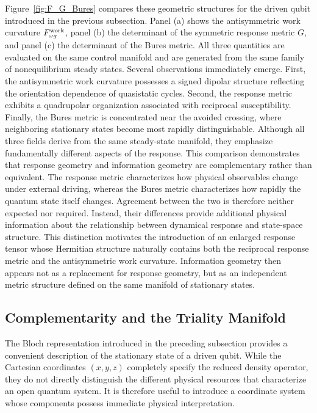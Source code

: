 Figure~\ref{fig:F_G_Bures} compares these geometric structures
for the driven qubit introduced in the previous subsection.
Panel (a) shows the antisymmetric work curvature
$F_{\omega g}^{\rm work}$, panel (b) the determinant of the
symmetric response metric $G$, and panel (c) the determinant of
the Bures metric. All three quantities are evaluated on the same
control manifold and are generated from the same family of
nonequilibrium steady states.
Several observations immediately emerge. First, the
antisymmetric work curvature possesses a signed dipolar
structure reflecting the orientation dependence of quasistatic
cycles. Second, the response metric exhibits a quadrupolar
organization associated with reciprocal susceptibility. Finally,
the Bures metric is concentrated near the avoided crossing,
where neighboring stationary states become most rapidly
distinguishable. Although all three fields derive from the same
steady-state manifold, they emphasize fundamentally different
aspects of the response.
This comparison demonstrates that response geometry and
information geometry are complementary rather than equivalent.
The response metric characterizes how physical observables change
under external driving, whereas the Bures metric characterizes
how rapidly the quantum state itself changes. Agreement between
the two is therefore neither expected nor required. Instead,
their differences provide additional physical information about
the relationship between dynamical response and state-space
structure.
This distinction motivates the introduction of an enlarged
response tensor whose Hermitian structure naturally contains both
the reciprocal response metric and the antisymmetric work
curvature. Information geometry then appears not as a
replacement for response geometry, but as an independent metric
structure defined on the same manifold of stationary states.




\subsection{Complementarity and the Triality Manifold}
The Bloch representation introduced in the preceding
subsection provides a convenient description of the
stationary state of a driven qubit. While the Cartesian
coordinates $(x,y,z)$ completely specify the reduced
density operator, they do not directly distinguish the
different physical resources that characterize an open
quantum system. It is therefore useful to introduce a
coordinate system whose components possess immediate
physical interpretation.

